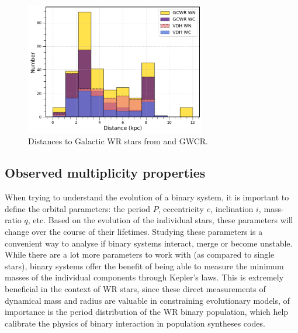 \begin{figure}
    \centering
    \includegraphics[width=0.7\textwidth]{chapters/introduction/image/dist_dist.png}
    \caption{Distances to Galactic WR stars from  and GWCR.}
    \label{fig:dist_dist}
\end{figure}


\subsection{Observed multiplicity properties}


When trying to understand the evolution of a binary system, it is important to define the orbital parameters: the period $P$, eccentricity $e$, inclination $i$, mass-ratio $q$, etc. Based on the evolution of the individual stars, these parameters will change over the course of their lifetimes. Studying these parameters is a convenient way to analyse if binary systems interact, merge or become unstable. While there are a lot more parameters to work with (as compared to single stars), binary systems offer the benefit of being able to measure the minimum masses of the individual components through Kepler's laws. This is extremely beneficial in the context of WR stars, since these direct measurements of dynamical mass and radius are valuable in constraining evolutionary models, of importance is the period distribution of the WR binary population, which help calibrate the physics of binary interaction in population syntheses codes.

